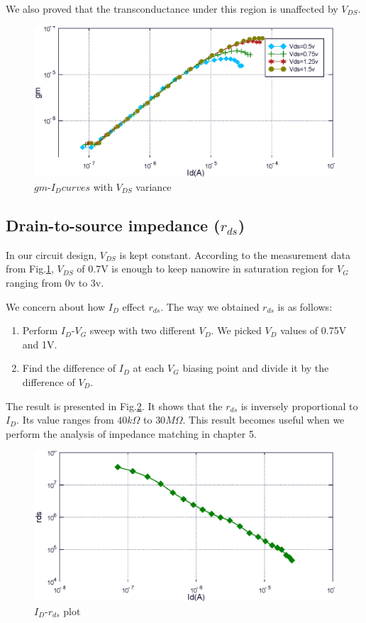 We also proved that the transconductance under this region is unaffected by $V_{DS}$.

\begin{figure}[tbp]
    \centering
    \includegraphics[width=1\textwidth]{images/chapter3/pIdgbs_Vd.eps}
    \caption{$gm$-$I_D curves$ with $V_{DS}$ variance}
    \label{fig:Idgbs_Vd}
\end{figure}

\subsection{Drain-to-source impedance ($r_{ds}$)} \label{sec:ch3rds}
In our circuit design, $V_{DS}$ is kept constant.
According to the measurement data from Fig.\ref{fig:Idgbs_Vd}, $V_{DS}$ of 0.7V is enough to keep nanowire in saturation region for $V_G$ ranging from 0v to 3v.

We concern about how $I_D$ effect $r_{ds}$.
The way we obtained $r_{ds}$ is as follows:
\begin{enumerate}
    \item Perform $I_D$-$V_G$ sweep with two different $V_D$. We picked $V_D$ values of 0.75V and 1V.
    \item Find the difference of $I_D$ at each $V_G$ biasing point and divide it by the difference of $V_D$.
\end{enumerate}
The result is presented in Fig.\ref{fig:rds}.
It shows that the $r_{ds}$ is inversely proportional to $I_D$.
Its value ranges from $40k \Omega$ to $30M \Omega$.
This result becomes useful when we perform the analysis of impedance matching in chapter 5.


\begin{figure}[tbp]
    \centering
    \includegraphics[width=1\textwidth]{images/chapter3/rds_I.eps}
    \caption{$I_D$-$r_{ds}$ plot}
    \label{fig:rds}
\end{figure}


